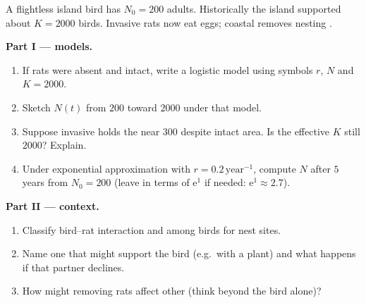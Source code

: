 \begin{problem}
\label{pb:g12:populations-conservation:1}
A flightless island bird has $N_0 = 200$ adults. Historically the island
supported about $K = 2000$ birds. Invasive rats now eat eggs; coastal
 removes nesting .

\medskip
\noindent\textbf{Part I ---  models.}
\begin{enumerate}
  \item If rats were absent and  intact, write a logistic model
        using symbols $r$, $N$ and $K=2000$.
  \item Sketch $N(t)$ from $200$ toward $2000$ under that model.
  \item Suppose invasive  holds the  near $300$
        despite intact  area. Is the effective $K$ still $2000$?
        Explain.
  \item Under exponential approximation with $r = 0.2\,\mathrm{year}^{-1}$,
        compute $N$ after $5$ years from $N_0=200$ (leave in terms of
        $\mathrm{e}^{1}$ if needed: $\mathrm{e}^{1}\approx 2.7$).
\end{enumerate}

\medskip
\noindent\textbf{Part II ---  context.}
\begin{enumerate}[resume]
  \item Classify bird--rat interaction and  among birds for
        nest sites.
  \item Name one  that might support the bird (e.g.\ with a
        plant) and what happens if that partner declines.
  \item How might removing rats affect other  (think beyond the
        bird alone)?
\end{enumerate}


\end{problem}
